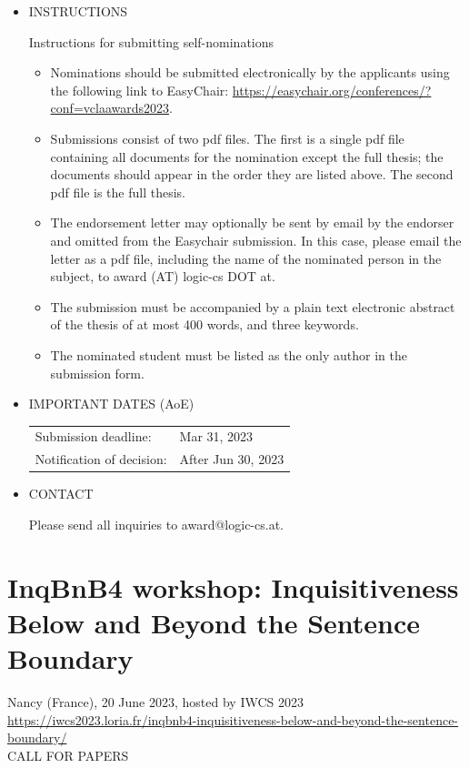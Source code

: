 \documentclass[prodmode,acmtecs]{acmsmall} %
\begin{document}
\begin{itemize}
\item  INSTRUCTIONS 
 
  Instructions for submitting self-nominations 
 
\begin{itemize}\item  Nominations should be submitted electronically by the applicants using the following link to EasyChair: \href{https://easychair.org/conferences/?conf=vclaawards2023}{https://easychair.org/conferences/?conf=vclaawards2023}.
\item  Submissions consist of two pdf files. The first is a single pdf file containing all documents for the nomination except the full thesis; the documents should appear in the order they are listed above. The second pdf file is the full thesis.
\item  The endorsement letter may optionally be sent by email by the endorser and omitted from the Easychair submission. In this case, please email the letter as a pdf file, including the name of the nominated person in the subject, to award (AT) logic-cs DOT at.
\item  The submission must be accompanied by a plain text electronic abstract of the thesis of at most 400 words, and three keywords.
\item  The nominated student must be listed as the only author in the submission form.
\end{itemize} 
\item  IMPORTANT DATES (AoE) 
 
\begin{tabulary}{\linewidth}{LL}Submission deadline:  & Mar 31, 2023 \\
Notification of decision:  & After Jun 30, 2023 \\
\end{tabulary}
 
\item  CONTACT 
 
  Please send all inquiries to award@logic-cs.at. 
 
\end{itemize}\section{InqBnB4 workshop: Inquisitiveness Below and Beyond the Sentence Boundary}\label{InqBnB4workshop}  Nancy (France), 20 June 2023, hosted by IWCS 2023\\ 
  \href{https://iwcs2023.loria.fr/inqbnb4-inquisitiveness-below-and-beyond-the-sentence-boundary/}{https://iwcs2023.loria.fr/inqbnb4-inquisitiveness-below-and-beyond-the-sentence-boundary/}\\ 
CALL FOR PAPERS 
\end{document}
